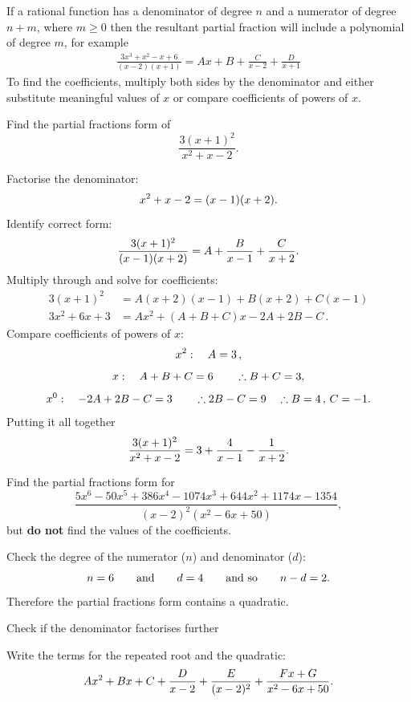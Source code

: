 If a rational function has a denominator of degree $n$ and a numerator of degree $n+m$, where $m\geq0$ then the resultant partial fraction will include a polynomial of degree $m$, for example
\begin{align*}
    \frac{3x^3+x^2-x+6}{(x-2)(x+1)}=Ax+B+\frac{C}{x-2} + \frac{D}{x+1}
\end{align*}
To find the coefficients, multiply both sides by the denominator and either substitute meaningful values of $x$ or compare coefficients of powers of $x$.

\goodbreak
\begin{example}[Lecture]
Find the partial fractions form of
\[
\frac{3(x+1)^2}{x^2+x-2}.
\]
\end{example}
%
\begin{solution}
Factorise the denominator:
\[
x^2+x-2=(x-1)(x+2).
\]
Identify correct form:
\[
\frac{3(x+1)^2}{(x-1)(x+2)}=A+\frac{B}{x-1}+\frac{C}{x+2}.
\]
Multiply through and solve for coefficients:
\begin{align*}
    3(x+1)^2 &= A(x+2)(x-1) + B(x+2) + C(x-1) \\
    3x^2 + 6x + 3 &= Ax^2 + (A+B+C)x - 2A + 2B - C \, .
\end{align*}
Compare coefficients of powers of $x$:
\[
x^2:\quad A=3 \, ,
\]
\[
x:\quad A+B+C=6 \qquad \therefore B+C=3,
\]
\[
x^0:\quad -2A+2B-C=3 \qquad \therefore 2B-C=9 \quad \therefore B=4 \, , \, C=-1.
\]
Putting it all together
\[
\frac{3(x+1)^2}{x^2+x-2}=3+\frac{4}{x-1}-\frac{1}{x+2}.
\]
\end{solution}

\goodbreak
\begin{example}[Video]
Find the partial fractions form for
\[
\frac{5x^6-50x^5+386x^4-1074x^3+644x^2+1174x-1354}{(x-2)^2(x^2-6x+50)},
\]
but \textbf{do not} find the values of the coefficients.
\end{example}
%
\begin{solution}
Check the degree of the numerator ($n$) and denominator ($d$):
\[
n=6 \qquad\text{and}\qquad d=4 \qquad\text{and so}\qquad n-d=2.
\]
Therefore the partial fractions form contains a quadratic.

Check if the denominator factorises further \par
{}

Write the terms for the repeated root and the quadratic:
\[
Ax^2+Bx+C+\frac{D}{x-2}+\frac{E}{(x-2)^2}+\frac{Fx+G}{x^2-6x+50}.
\]
\end{solution}

